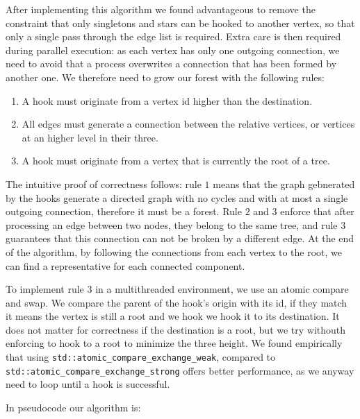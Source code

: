 After implementing this algorithm we found advantageous to remove the constraint
that only singletons and stars can be hooked to another vertex, so that only a single pass through
the edge list is required. Extra care is then required during parallel execution: as each vertex has only one outgoing
connection, we need to avoid that a process overwrites a connection that has been formed by another one.
We therefore need to grow our forest with the following rules:

\begin{enumerate}
    \item A hook must originate from a vertex id higher than the destination.
    \item All edges must generate a connection between the relative vertices, or vertices at an higher level in their three.
    \item A hook must originate from a vertex that is currently the root of a tree.
\end{enumerate}

The intuitive proof of correctness follows: rule $1$ means that the graph gebnerated by the
hooks generate a directed graph with no cycles and with at most a single outgoing connection, therefore it must be a forest.
Rule $2$ and $3$ enforce that after processing an edge between two nodes,
they belong to the same tree, and rule $3$ guarantees that this connection can not be broken by a different edge.
At the end of the algorithm, by following the connections from each vertex to the root, we can find a representative for each connected component.

To implement rule $3$ in a multithreaded environment, we use an atomic compare and swap.
We compare the parent of the hook's origin with its id, if they match it means the vertex is still a root and we
hook we hook it to its destination. It does not matter for correctness if the destination is a root, but we try withouth enforcing to
hook to a root to minimize the three height.
We found empirically that using \verb|std::atomic_compare_exchange_weak|,
compared to \verb|std::atomic_compare_exchange_strong| offers better performance, as we anyway need to loop until a hook is successful.


In pseudocode our algorithm is:

